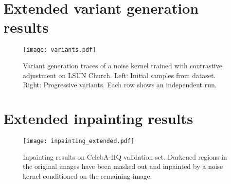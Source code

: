 \documentclass[10pt,twocolumn,letterpaper]{article}
\begin{document}
\newpage
\section{Extended variant generation results}\label{app:imagevariants}

\begin{figure}[h!]
  \centering
  \texttt{[image: variants.pdf]}\caption{
    Variant generation traces of a noise kernel trained with contrastive adjustment on LSUN Church.
    Left: Initial samples from dataset.
    Right: Progressive variants.
    Each row shows an independent run.
  }\end{figure}


\newpage
\section{Extended inpainting results}\label{app:inpainting}

\begin{figure}[h!]
  \centering
  \texttt{[image: inpainting\_extended.pdf]}\caption{
    Inpainting results on CelebA-HQ validation set.
    Darkened regions in the original images have been masked out and inpainted by a noise kernel conditioned on the remaining image.
  }\end{figure}
\end{document}
